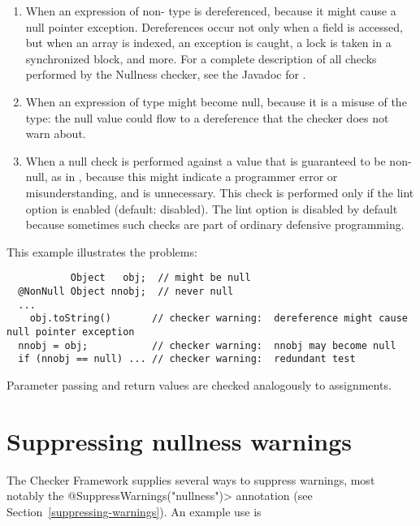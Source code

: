 \begin{enumerate}

\item
  When an expression of non- type
  is dereferenced, because it might cause a null pointer exception.
  Dereferences occur not only when a field is accessed, but when an array
  is indexed, an exception is caught, a lock is taken in a synchronized
  block, and more.  For a complete description of all checks performed by
  the Nullness checker, see the Javadoc for
  .

\item
  When an expression of  type
  might become null, because it
  is a misuse of the type:  the null value could flow to a dereference that
  the checker does not warn about.

\item
  \label{lint-nulltest}
  When a null check is performed against a value that is guaranteed to be
  non-null, as in , because this might indicate a
  programmer error or misunderstanding, and is unnecessary.
  This check is performed only if the  lint option is
  enabled (default: disabled).  The lint option is disabled by default
  because sometimes such checks are part of ordinary defensive programming.

\end{enumerate}

This example illustrates the problems:

\begin{Verbatim}
           Object   obj;  // might be null
  @NonNull Object nnobj;  // never null
  ...
    obj.toString()       // checker warning:  dereference might cause null pointer exception
  nnobj = obj;           // checker warning:  nnobj may become null
  if (nnobj == null) ... // checker warning:  redundant test
\end{Verbatim}

Parameter passing and return values are checked analogously to assignments.



\section{Suppressing nullness warnings\label{suppressing-warnings-nullness}}

The Checker Framework supplies several ways to suppress warnings, most
notably the \<@SuppressWarnings("nullness")> annotation (see
Section~\ref{suppressing-warnings}).  An example use is


